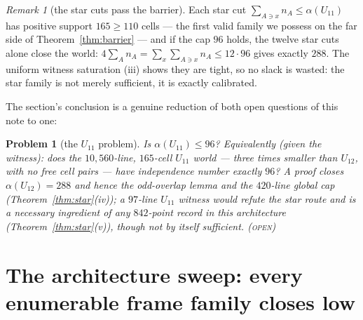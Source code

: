 \documentclass[11pt]{article}
\newtheorem{problem}[theorem]{Problem}
\theoremstyle{remark}
\newtheorem{remark}[theorem]{Remark}
\begin{document}
\begin{remark}[the star cuts pass the barrier]
Each star cut $\sum_{A\ni x}n_A\le\alpha(U_{11})$ has positive support
$165\ge110$ cells --- the first valid family we possess on the far side of
Theorem~\ref{thm:barrier} --- and if the cap $96$ holds, the twelve star
cuts alone close the world: $4\sum_A n_A=\sum_x\sum_{A\ni x}n_A
\le12\cdot96$ gives exactly $288$. The uniform witness saturation (iii)
shows they are tight, so no slack is wasted: the star family is not
merely sufficient, it is exactly calibrated.
\end{remark}

The section's conclusion is a genuine reduction of both open questions of
this note to one:

\begin{problem}[the $U_{11}$ problem]\label{prob:u11}
Is $\alpha(U_{11})\le 96$? Equivalently (given the witness): does the
$10{,}560$-line, $165$-cell $U_{11}$ world --- three times smaller than
$U_{12}$, with no free cell pairs --- have independence number exactly
$96$? A proof closes $\alpha(U_{12})=288$ and hence the odd-overlap lemma
and the $420$-line global cap (Theorem~\ref{thm:star}(iv)); a $97$-line
$U_{11}$ witness would refute the star route and is a \emph{necessary}
ingredient of any $842$-point record in this architecture
(Theorem~\ref{thm:star}(v)), though not by itself sufficient.
\textsc{(open)}
\end{problem}

\section{The architecture sweep: every enumerable frame family closes
low}\label{sec:sweep}
\end{document}
